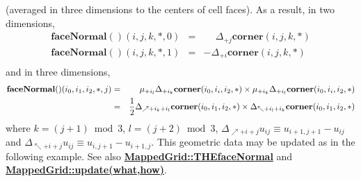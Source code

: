 \documentclass{article}
\begin{document}
    (averaged in three dimensions to the centers of cell faces).  As a result, in two dimensions,
    \begin{eqnarray*}
      \textbf{faceNormal}()(i,j,k,\ast,0) & = & \phantom{-} \Delta_{+j} \textbf{corner}(i,j,k,\ast) \\
      \textbf{faceNormal}()(i,j,k,\ast,1) & = &          -  \Delta_{+i} \textbf{corner}(i,j,k,\ast) \\
    \end{eqnarray*}
    and in three dimensions,
    \begin{eqnarray*}
      \textbf{faceNormal}()(i_0,i_1,i_2,\ast,j)
      & = & \mu_{+i_l} \Delta_{+i_k} \textbf{corner}(i_0,i_i,i_2,\ast) \times \mu_{+i_k} \Delta_{+i_l} \textbf{corner}(i_0,i_i,i_2,\ast) \\
      & = & {1\over2} \Delta_{\nearrow+i_k+i_l} \textbf{corner}(i_0,i_1,i_2,\ast) \times \Delta_{\nwarrow+i_l+i_k} \textbf{corner}(i_0,i_1,i_2,\ast) \\
    \end{eqnarray*}
    where $k=(j+1)\bmod3$, $l=(j+2)\bmod3$,
    $\Delta_{\nearrow+i+j} u_{ij} \equiv u_{i+1,j+1}-u_{ij}$ and
    $\Delta_{\nwarrow+i+j} u_{ij} \equiv u_{i,j+1}-u_{i+1,j}$.
    This geometric data may be updated as in the following example.
    See also {\bf{}\hyperref{THEfaceNormal}{THEfaceNormal \rm(\S}{)}{MappedGrid::THEfaceNormal}}
    and {\bf{}\hyperref{update(what,how)}{update(what,how) \rm(\S}{)}{MappedGrid::update(what,how)}}.
\end{document}
